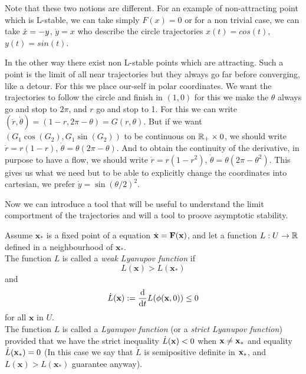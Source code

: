 \begin{remarque}
Note that these two notions are different. For an example of non-attracting point which is L-stable, we can take simply $F(x)=0$ or for a non trivial case, we can take $\dot{x} = -y$, $\dot{y} = x$ who describe the circle trajectories $x(t)=cos(t)$, $y(t)=sin(t)$.

In the other way there exist non L-stable points which are attracting. Such a point is the limit of all near trajectories but they always go far before converging, like a detour. For this we place our-self in polar coordinates. We want the trajectories to follow the circle and finish in $(1,0)$ for this we make the $\theta$ always go and stop to $2\pi$, and $r$ go and stop to 1. For this we can write $(\dot{r},\dot{\theta})=(1-r,2\pi-\theta) = G(r,\theta)$. But if we want $(G_1\cos(G_2),G_1\sin(G_2))$ to be continuous on $\mathbb{R}_+\times 0$, we should write $\dot{r} = r(1-r)$, $\dot{\theta} = \theta(2\pi-\theta)$. And to obtain the continuity of the derivative, in purpose to have a flow, we should write $\dot{r} = r(1-r^2)$, $\dot{\theta} = \theta(2\pi-\theta^2)$. This gives us what we need but to be able to explicitly change the coordinates into cartesian, we prefer $\dot{y} = \sin(\theta/2)^2$.
\end{remarque}

Now we can introduce a tool that will be useful to understand the limit comportment of the trajectories and will a tool to proove asymptotic stability.

\begin{definition}
    Assume $\mathbf{x}_*$ is a fixed point of a equation $\dot{\mathbf{x}} = \mathbf{F}(\mathbf{x})$, and let a function $L:U\to\mathbb{R}$ defined in a neighbourhood of $\mathbf{x}_*$.
    \\
    The function $L$ is called a \emph{weak Lyanupov function} if \[L(\mathbf{x})>L(\mathbf{x}_*)\] 
    and 
    \[ \dot{L}(\mathbf{x}):=\frac{\mathrm{d}}{\mathrm{d} t}L(\phi(\mathbf{x},0)) \leq 0 \]
    for all $\mathbf{x}$ in $U$.
    \\
    The function $L$ is called a \emph{Lyanupov function} (or a \emph{strict Lyanupov function}) provided that we have the strict inequality $\dot{L}(\mathbf{x}) < 0$ when $\mathbf{x}\neq\mathbf{x}_*$ and equality $\dot{L}(\mathbf{x}_*) = 0$ (In this case we say that $\dot{L}$ is semipositive definite in $\mathbf{x}_*$, and $L(\mathbf{x})>L(\mathbf{x}_*)$ guarantee anyway).
\end{definition}

